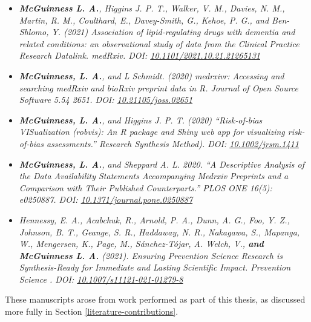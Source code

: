 \documentclass[a4paper, twoside]{templates/ociamthesis}
\newcommand*{\bibtitle}{Bibliography}
\begin{document}
\begin{itemize}
\item
  \emph{\textbf{McGuinness L. A.}, Higgins J. P. T., Walker, V. M., Davies, N. M., Martin, R. M., Coulthard, E., Davey-Smith, G., Kehoe, P. G., and Ben-Shlomo, Y. (2021) Association of lipid-regulating drugs with dementia and related conditions: an observational study of data from the Clinical Practice Research Datalink. medRxiv. DOI: \href{https://doi.org/10.1101/2021.10.21.21265131}{10.1101/2021.10.21.21265131}}
\item
  \emph{\textbf{McGuinness, L. A.}, and L Schmidt. (2020) medrxivr: Accessing and searching medRxiv and bioRxiv preprint data in R. Journal of Open Source Software 5.54 2651. DOI: \href{https://doi.org/10.21105/joss.02651}{10.21105/joss.02651}}
\item
  \emph{\textbf{McGuinness, L. A.}, and Higgins J. P. T. (2020) ``Risk‐of‐bias VISualization (robvis): An R package and Shiny web app for visualizing risk‐of‐bias assessments.'' Research Synthesis Method). DOI: \href{https://doi.org/10.1002/jrsm.1411}{10.1002/jrsm.1411}}
\item
  \emph{\textbf{McGuinness, L. A.}, and Sheppard A. L. 2020. ``A Descriptive Analysis of the Data Availability Statements Accompanying Medrxiv Preprints and a Comparison with Their Published Counterparts.'' PLOS ONE 16(5): e0250887. DOI: \href{https://doi.org/10.1371/journal.pone.0250887}{10.1371/journal.pone.0250887}}
\item
  \emph{Hennessy, E. A., Acabchuk, R., Arnold, P. A., Dunn, A. G., Foo, Y. Z., Johnson, B. T., Geange, S. R., Haddaway, N. R., Nakagawa, S., Mapanga, W., Mengersen, K., Page, M., Sánchez-Tójar, A. Welch, V., \textbf{and McGuinness L. A.} (2021). Ensuring Prevention Science Research is Synthesis-Ready for Immediate and Lasting Scientific Impact. Prevention Science . DOI: \href{https://doi.org/10.1007/s11121-021-01279-8}{10.1007/s11121-021-01279-8}}
\end{itemize}

These manuscripts arose from work performed as part of this thesis, as discussed more fully in Section \ref{literature-contributions}.








\setlength{\baselineskip}{0pt} %

{\renewcommand*\MakeUppercase[1]{#1}%
\printbibliography[heading=bibintoc,title={\bibtitle}]}
\end{document}
